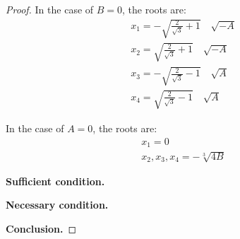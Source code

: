 \documentclass[12pt]{article}
\begin{document}
\begin{proof}
In the case of $B = 0$, the roots are:
\begin{align}
    x_1 = -\sqrt{\frac{2}{\sqrt{3}}+1} \quad \sqrt{-A}    \\
    x_2 = \sqrt{\frac{2}{\sqrt{3}}+1}  \quad \sqrt{-A}    \\
    x_3 = -\sqrt{\frac{2}{\sqrt{3}}-1} \quad \sqrt{A}     \\
    x_4 = \sqrt{\frac{2}{\sqrt{3}}-1}  \quad \sqrt{A} 
\end{align}

In the case of $A = 0$, the roots are:
\begin{align}
    x_1 = 0 \\
    x_2,x_3,x_4 = -\sqrt[3]{4 B}
\end{align}
    

\item{\textbf{Sufficient condition.}}


\item{\textbf{Necessary condition.}}


\item{\textbf{Conclusion.}}


\end{proof}
\end{document}

